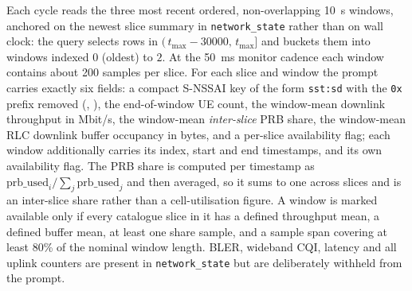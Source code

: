 Each cycle reads the three most recent ordered, non-overlapping 10~s windows, anchored on the newest slice summary in \texttt{network\_state} rather than on wall clock: the query selects rows in $(\,t_{\max}-30000,\,t_{\max}]$ and buckets them into windows indexed $0$ (oldest) to $2$. At the 50~ms monitor cadence each window contains about 200 samples per slice. For each slice and window the prompt carries exactly six fields: a compact S-NSSAI key of the form \texttt{sst:sd} with the \texttt{0x} prefix removed (\snssaiA, \snssaiB), the end-of-window UE count, the window-mean downlink throughput in Mbit/s, the window-mean \emph{inter-slice} PRB share, the window-mean RLC downlink buffer occupancy in bytes, and a per-slice availability flag; each window additionally carries its index, start and end timestamps, and its own availability flag. The PRB share is computed per timestamp as $\mathrm{prb\_used}_i/\sum_j\mathrm{prb\_used}_j$ and then averaged, so it sums to one across slices and is an inter-slice share rather than a cell-utilisation figure. A window is marked available only if every catalogue slice in it has a defined throughput mean, a defined buffer mean, at least one share sample, and a sample span covering at least 80\% of the nominal window length. BLER, wideband CQI, latency and all uplink counters are present in \texttt{network\_state} but are deliberately withheld from the prompt.

